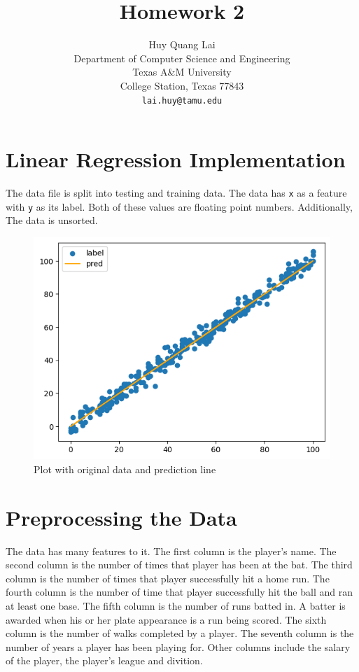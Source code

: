 \documentclass{article}
\title{Homework 2}
\author{
    Huy Quang Lai \\
    Department of Computer Science and Engineering\\
    Texas A\&M University\\
    College Station, Texas 77843 \\
    \texttt{lai.huy@tamu.edu} \\
}
\begin{document}
\maketitle

\section{Linear Regression Implementation}
The data file is split into testing and training data. The data has \verb+x+ as a feature with \verb+y+ as its label.
Both of these values are floating point numbers.
 Additionally, The data is unsorted.
\begin{figure}[!ht]
    \centering
    \includegraphics[width=\textwidth]{linear_reg.png}
    \caption{Plot with original data and prediction line}
\end{figure}

\clearpage
\section{Preprocessing the Data}

The data has many features to it.
The first column is the player's name.
The second column is the number of times that player has been at the bat.
The third column is the number of times that player successfully hit a home run.
The fourth column is the number of time that player successfully hit the ball and ran at least one base.
The fifth column is the number of runs batted in. A batter is awarded when his or her plate appearance is a run being scored.
The sixth column is the number of walks completed by a player.
The seventh column is the number of years a player has been playing for.
Other columns include the salary of the player, the player's league and divition.
\end{document}
